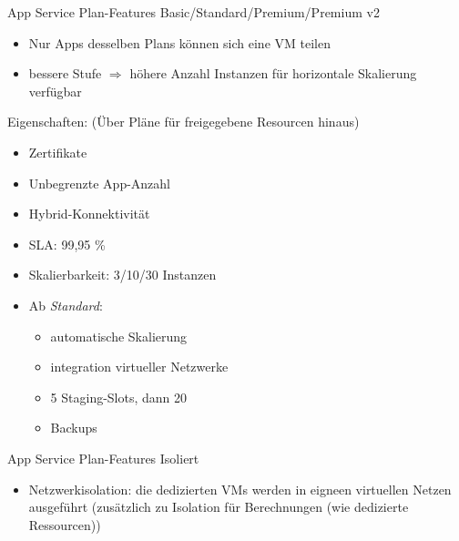 \begin{flashcard}[Definition]{App Service Plan-Features Basic/Standard/Premium/Premium v2}
    \begin{itemize}
        \item Nur Apps desselben Plans können sich eine VM teilen
        \item bessere Stufe $\Rightarrow$ höhere Anzahl Instanzen für horizontale Skalierung verfügbar
    \end{itemize}
    Eigenschaften: (Über Pläne für freigegebene Resourcen hinaus)
    \begin{itemize}
        \item Zertifikate\vspace{-0.5mm}
        \item Unbegrenzte App-Anzahl\vspace{-0.5mm}
        \item Hybrid-Konnektivität\vspace{-0.5mm}
        \item SLA: 99,95 \%\vspace{-0.5mm}
        \item Skalierbarkeit: 3/10/30 Instanzen\vspace{-0.5mm}
        \item Ab \emph{Standard}:\vspace{-1mm}
            \begin{itemize}
                \item automatische Skalierung\vspace{-1mm}
                \item integration virtueller Netzwerke\vspace{-1mm}
                \item 5 Staging-Slots, dann 20\vspace{-1mm}
                \item Backups\vspace{-1mm}
            \end{itemize}
    \end{itemize}
\end{flashcard}

\begin{flashcard}[Definition]{App Service Plan-Features Isoliert}
    \begin{itemize}
        \item Netzwerkisolation: die dedizierten VMs werden in eigneen virtuellen Netzen ausgeführt\newline
            (zusätzlich zu Isolation für Berechnungen (wie dedizierte Ressourcen))
    \end{itemize}
\end{flashcard}

